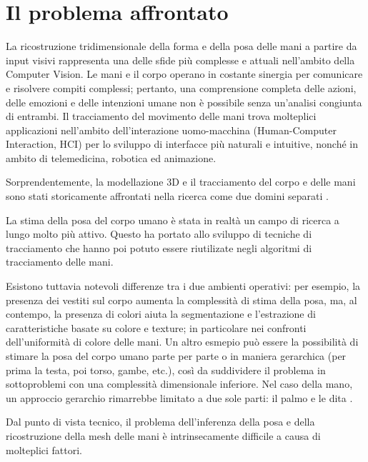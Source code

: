 \section{Il problema affrontato}

La ricostruzione tridimensionale della forma e della posa delle mani a partire da input visivi rappresenta una delle sfide più complesse e attuali nell'ambito della Computer Vision.
Le mani e il corpo operano in costante sinergia per comunicare e risolvere compiti complessi; pertanto, una comprensione completa delle azioni, delle emozioni e delle intenzioni umane non è possibile senza un'analisi congiunta di entrambi.
Il tracciamento del movimento delle mani trova molteplici applicazioni nell'ambito dell'interazione uomo-macchina (Human-Computer Interaction, HCI) per lo sviluppo di interfacce più naturali e intuitive, nonché in ambito di telemedicina, robotica ed animazione.

Sorprendentemente, la modellazione 3D e il tracciamento del corpo e delle mani sono stati storicamente affrontati nella ricerca come due domini separati \cite{MANO:SIGGRAPHASIA:2017,EROL200752}.

La stima della posa del corpo umano è stata in realtà un campo di ricerca a lungo molto più attivo.
Questo ha portato allo sviluppo di tecniche di tracciamento che hanno poi potuto essere riutilizate negli algoritmi di tracciamento delle mani.

Esistono tuttavia notevoli differenze tra i due ambienti operativi:
per esempio, la presenza dei vestiti sul corpo aumenta la complessità di stima della posa, ma, al contempo, la presenza di colori aiuta la segmentazione e l'estrazione di caratteristiche basate su colore e texture;
in particolare nei confronti dell'uniformità di colore delle mani.
Un altro esmepio può essere la possibilità di stimare la posa del corpo umano parte per parte o in maniera gerarchica (per prima la testa, poi torso, gambe, etc.), così da suddividere il problema in sottoproblemi con una complessità dimensionale inferiore.
Nel caso della mano, un approccio gerarchio rimarrebbe limitato a due sole parti: il palmo e le dita \cite{EROL200752}.

Dal punto di vista tecnico, il problema dell'inferenza della posa e della ricostruzione della mesh delle mani è intrinsecamente difficile a causa di molteplici fattori.

